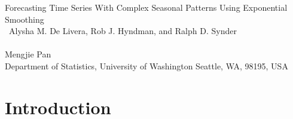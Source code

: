 \documentclass{uwstat572}
\begin{document}

\begin{center}
  {\LARGE Forecasting Time Series With Complex Seasonal Patterns Using Exponential Smoothing  }\\\ 
  {\large Alysha M. De Livera, Rob J. Hyndman, and Ralph D. Synder}\\\ \\
  {Mengjie Pan \\ 
    Department of Statistics, University of Washington Seattle, WA, 98195, USA
  }
\end{center}



\section{Introduction}
\end{document}
